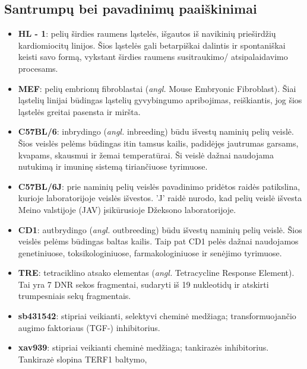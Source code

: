 \documentclass[12pt]{article}
\begin{document}
\newpage

\subsection{Santrumpų bei pavadinimų paaiškinimai}
\begin{itemize}
    \item \textbf{HL - 1}: pelių širdies raumens ląstelės, išgautos
          iš navikinių prieširdžių kardiomiocitų linijos. Šios ląstelės
          gali betarpiškai dalintis ir spontaniškai keisti
          savo formą, vykstant širdies raumens susitraukimo/
          atsipalaidavimo procesams.
    \item \textbf{MEF}: pelių embrionų fibroblastai (\emph{angl.}
          Mouse Embryonic Fibroblast). Šiai ląstelių
          linijai būdingas ląstelių gyvybingumo apribojimas,
          reiškiantis, jog šios ląstelės greitai pasensta ir miršta.
    \item \textbf{C57BL/6}: inbrydingo (\emph{angl.} inbreeding) būdu
          išvestų naminių pelių veislė. Šios veislės pelėms
          būdingas itin tamsus kailis, padidėjęs jautrumas garsams,
          kvapams, skausmui ir žemai temperatūrai. Ši veislė
          dažnai naudojama nutukimą ir imuninę sistemą tiriančiuose
          tyrimuose.
    \item \textbf{C57BL/6J}: prie naminių pelių veislės pavadinimo
          pridėtos raidės patikslina, kurioje laboratorijoje veislės
          išvestos. 'J' raidė nurodo, kad pelių veislė išvesta Meino
          valstijoje (JAV) įsikūrusioje Džeksono laboratorijoje\cite{JCKSLAB}.
    \item \textbf{CD1}: autbrydingo (\emph{angl.} outbreeding) būdu
          išvestų naminių pelių veislė. Šios veislės pelėms
          būdingas baltas kailis. Taip pat CD1 pelės dažnai naudojamos
          genetiniuose, toksikologiniuose, farmakologiniuose ir
          senėjimo tyrimuose.
    \item \textbf{TRE}: tetraciklino atsako elementas (\emph{angl.} 
          Tetracycline Response Element). Tai yra 7 DNR sekos fragmentai,
          sudaryti iš 19 nukleotidų ir atskirti trumpesniais sekų
          fragmentais.
    \item \textbf{sb431542}: stipriai veikianti, selektyvi cheminė
          medžiaga; transformuojančio augimo faktoriaus {\textbeta}
          (TGF-{\textbeta}) inhibitorius.
    \item \textbf{xav939}: stipriai veikianti cheminė medžiaga;
          tankirazės inhibitorius. Tankirazė slopina TERF1 baltymo,

\end{itemize}
\end{document}
